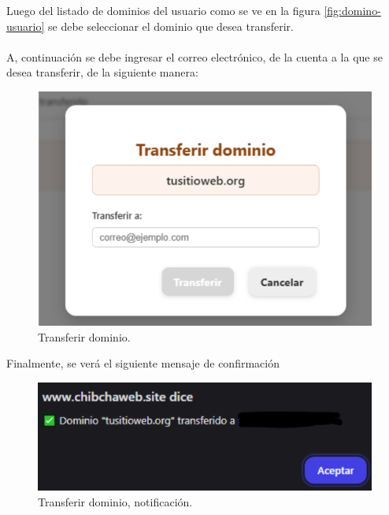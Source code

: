 Luego del listado de dominios del usuario como se ve en la figura \ref{fig:domino-usuario} se debe seleccionar el dominio que desea transferir.\\\\
A, continuación  se debe ingresar el correo electrónico, de la cuenta a la que se desea transferir, de la siguiente manera:

\begin{figure}[H]
    \centering
\includegraphics[width=0.6\linewidth]{casosuso/dominios-transferir.png}
\caption{Transferir dominio.}
\label{fig:dominios-transferir}
\end{figure}

Finalmente, se verá el siguiente mensaje de confirmación
\begin{figure}[H]
    \centering
\includegraphics[width=0.6\linewidth]{casosuso/dominios-aviso.png}
\caption{Transferir dominio, notificación.}
\label{fig:dominios-aviso}
\end{figure}
